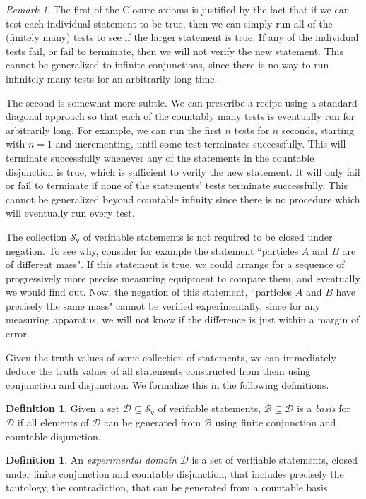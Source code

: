 \documentclass[psamsfonts]{amsart}
\theoremstyle{definition}
\newtheorem{defn}[thm]{Definition}
\theoremstyle{remark}
\newtheorem{rem}[thm]{Remark}
\numberwithin{equation}{section}
\def\vstmtSet{\mathcal{S}_\textsf{v}}
\newcommand{\edomain}[1][D] {\mathcal{#1}}
\newcommand{\basis}[1][B] {\mathcal{#1}} %
\begin{document}
\begin{rem}
The first of the Closure axioms is justified by the fact that if we can test each individual statement to be true, then we can simply run all of the (finitely many) tests to see if the larger statement is true. If any of the individual tests fail, or fail to terminate, then we will not verify the new statement. This cannot be generalized to infinite conjunctions, since there is no way to run infinitely many tests for an arbitrarily long time. 

The second is somewhat more subtle. We can prescribe a recipe using a standard diagonal approach so that each of the countably many tests is eventually run for arbitrarily long. For example, we can run the first $n$ tests for $n$ seconds, starting with $n=1$ and incrementing, until some test terminates successfully. This will terminate successfully whenever any of the statements in the countable disjunction is true, which is sufficient to verify the new statement. It will only fail or fail to terminate if none of the statements' tests terminate successfully. This cannot be generalized beyond countable infinity since there is no procedure which will eventually run every test. 
\end{rem} 

The collection $\vstmtSet$ of verifiable statements is not required to be closed under negation. To see why, consider for example the statement ``particles $A$ and $B$ are of different mass". If this statement is true, we could arrange for a sequence of progressively more precise measuring equipment to compare them, and eventually we would find out. Now, the negation of this statement, ``particles $A$ and $B$ have precisely the same mass" cannot be verified experimentally, since for any measuring apparatus, we will not know if the difference is just within a margin of error. 

Given the truth values of some collection of statements, we can immediately deduce the truth values of all statements constructed from them using conjunction and disjunction. We formalize this in the following definitions. 

\begin{defn}
Given a set $\edomain\subseteq\vstmtSet$ of verifiable statements, $\basis\subseteq\edomain$ is a \emph{basis} for $\edomain$ if all elements of $\edomain$ can be generated from $\basis$ using finite conjunction and countable disjunction. 
\end{defn}

\begin{defn}
An \emph{experimental domain} $\edomain$ is a set of verifiable statements, closed under finite conjunction and countable disjunction, that includes precisely the tautology, the contradiction, that can be generated from a countable basis.
\end{defn}
\end{document}
